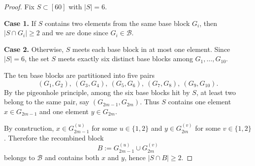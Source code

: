 \documentclass[10pt,a4paper]{amsart}
\begin{document}
\begin{proof}
Fix $S\subset[60]$ with $|S|=6$.

\smallskip
\noindent\textbf{Case 1.} If $S$ contains two elements from the same base block $G_i$, then
$|S\cap G_i|\ge 2$ and we are done since $G_i\in\mathcal{B}$.

\smallskip
\noindent\textbf{Case 2.} Otherwise, $S$ meets each base block in at most one element. Since
$|S|=6$, the set $S$ meets exactly six distinct base blocks among $G_1,\dots,G_{10}$.

The ten base blocks are partitioned into five pairs
\[
(G_1,G_2),\ (G_3,G_4),\ (G_5,G_6),\ (G_7,G_8),\ (G_9,G_{10}).
\]
By the pigeonhole principle, among the six base blocks hit by $S$, at least two belong to the same
pair, say $(G_{2m-1},G_{2m})$. Thus $S$ contains one element
$x\in G_{2m-1}$ and one element $y\in G_{2m}$.

By construction, $x\in G_{2m-1}^{(u)}$ for some $u\in\{1,2\}$ and
$y\in G_{2m}^{(v)}$ for some $v\in\{1,2\}$. Therefore the recombined block
\[
B:=G_{2m-1}^{(u)}\cup G_{2m}^{(v)}
\]
belongs to $\mathcal{B}$ and contains both $x$ and $y$, hence $|S\cap B|\ge 2$.
\end{proof}
\end{document}
